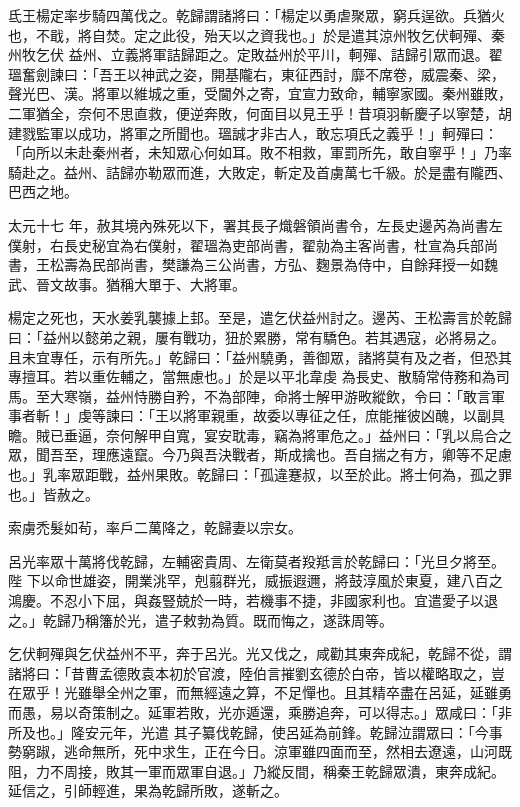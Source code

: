 \begin{pinyinscope}
 氐王楊定率步騎四萬伐之。乾歸謂諸將曰：「楊定以勇虐聚眾，窮兵逞欲。兵猶火也，不戢，將自焚。定之此役，殆天以之資我也。」於是遣其涼州牧乞伏軻殫、秦州牧乞伏
 益州、立義將軍詰歸距之。定敗益州於平川，軻殫、詰歸引眾而退。翟瑥奮劍諫曰：「吾王以神武之姿，開基隴右，東征西討，靡不席卷，威震秦、梁，聲光巴、漢。將軍以維城之重，受閫外之寄，宜宣力致命，輔寧家國。秦州雖敗，二軍猶全，奈何不思直救，便逆奔敗，何面目以見王乎！昔項羽斬慶子以寧楚，胡建戮監軍以成功，將軍之所聞也。瑥誠才非古人，敢忘項氏之義乎！」軻殫曰：「向所以未赴秦州者，未知眾心何如耳。敗不相救，軍罰所先，敢自寧乎！」乃率騎赴之。益州、詰歸亦勒眾而進，大敗定，斬定及首虜萬七千級。於是盡有隴西、巴西之地。



 太元十七
 年，赦其境內殊死以下，署其長子熾磐領尚書令，左長史邊芮為尚書左僕射，右長史秘宜為右僕射，翟瑥為吏部尚書，翟勍為主客尚書，杜宣為兵部尚書，王松壽為民部尚書，樊謙為三公尚書，方弘、麴景為侍中，自餘拜授一如魏武、晉文故事。猶稱大單于、大將軍。



 楊定之死也，天水姜乳襲據上邽。至是，遣乞伏益州討之。邊芮、王松壽言於乾歸曰：「益州以懿弟之親，屢有戰功，狃於累勝，常有驕色。若其遇寇，必將易之。且未宜專任，示有所先。」乾歸曰：「益州驍勇，善御眾，諸將莫有及之者，但恐其專擅耳。若以重佐輔之，當無慮也。」於是以平北韋虔
 為長史、散騎常侍務和為司馬。至大寒嶺，益州恃勝自矜，不為部陣，命將士解甲游畋縱飲，令曰：「敢言軍事者斬！」虔等諫曰：「王以將軍親重，故委以專征之任，庶能摧彼凶醜，以副具瞻。賊已垂逼，奈何解甲自寬，宴安耽毒，竊為將軍危之。」益州曰：「乳以烏合之眾，聞吾至，理應遠竄。今乃與吾決戰者，斯成擒也。吾自揣之有方，卿等不足慮也。」乳率眾距戰，益州果敗。乾歸曰：「孤違蹇叔，以至於此。將士何為，孤之罪也。」皆赦之。



 索虜禿髮如茍，率戶二萬降之，乾歸妻以宗女。



 呂光率眾十萬將伐乾歸，左輔密貴周、左衛莫者羖羝言於乾歸曰：「光旦夕將至。陛
 下以命世雄姿，開業洮罕，剋翦群光，威振遐邇，將鼓淳風於東夏，建八百之鴻慶。不忍小下屈，與姦豎兢於一時，若機事不捷，非國家利也。宜遣愛子以退之。」乾歸乃稱籓於光，遣子敕勃為質。既而悔之，遂誅周等。



 乞伏軻殫與乞伏益州不平，奔于呂光。光又伐之，咸勸其東奔成紀，乾歸不從，謂諸將曰：「昔曹孟德敗袁本初於官渡，陸伯言摧劉玄德於白帝，皆以權略取之，豈在眾乎！光雖舉全州之軍，而無經遠之算，不足憚也。且其精卒盡在呂延，延雖勇而愚，易以奇策制之。延軍若敗，光亦遁還，乘勝追奔，可以得志。」眾咸曰：「非所及也。」隆安元年，光遣
 其子纂伐乾歸，使呂延為前鋒。乾歸泣謂眾曰：「今事勢窮踧，逃命無所，死中求生，正在今日。涼軍雖四面而至，然相去遼遠，山河既阻，力不周接，敗其一軍而眾軍自退。」乃縱反間，稱秦王乾歸眾潰，東奔成紀。延信之，引師輕進，果為乾歸所敗，遂斬之。




\end{pinyinscope}

